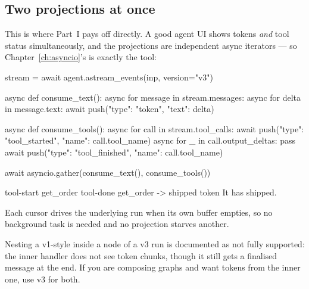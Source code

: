 \subsection{Two projections at once}
\label{sec:concurrent-projections}

This is where Part~I pays off directly. A good agent UI shows tokens
\emph{and} tool status simultaneously, and the projections are independent async
iterators --- so Chapter~\ref{ch:asyncio}'s  is exactly the tool:

\begin{python}[caption={Consuming two projections concurrently}, label={lst:two-projections}]
stream = await agent.astream_events(inp, version="v3")


async def consume_text():
    async for message in stream.messages:
        async for delta in message.text:
            await push({"type": "token", "text": delta})


async def consume_tools():
    async for call in stream.tool_calls:
        await push({"type": "tool_started", "name": call.tool_name})
        async for _ in call.output_deltas:
            pass
        await push({"type": "tool_finished", "name": call.tool_name})


await asyncio.gather(consume_text(), consume_tools())
\end{python}

\begin{console}
tool-start  get_order
tool-done   get_order -> shipped
token       It has shipped.
\end{console}


Each cursor drives the underlying run when its own buffer empties, so no
background task is needed and no projection starves another.

\begin{warning}
Nesting a v1-style  inside a node of a v3
run is documented as not fully supported: the inner handler does not see token
chunks, though it still gets a finalised message at the end. If you are composing
graphs and want tokens from the inner one, use v3 for both.
\end{warning}

